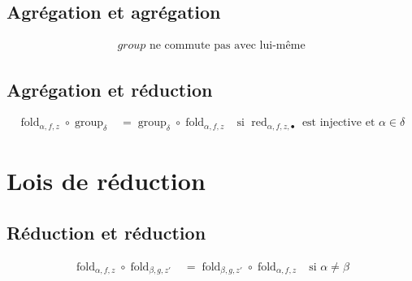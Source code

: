 \documentclass[french]{article}
\DeclareMathOperator{\group}{group}
\DeclareMathOperator{\redu}{red}
\newcommand{\groupDelta}{\group_{\delta}}
\newcommand{\fold}[3]{\operatorname{fold}_{#1, #2, #3}}
\newcommand{\foldAlphafz}{\fold{\alpha}{f}{z}}
\begin{document}
\subsection*{Agrégation et agrégation}
\begin{align}
\text{$group$ ne commute pas avec lui-même}
\end{align}

\subsection*{Agrégation et réduction}
\begin{align}
\foldAlphafz \circ \groupDelta
& = \groupDelta \circ \foldAlphafz
& \text{si $\redu_{\alpha, f, z, \bullet}$ est injective et $\alpha \in \delta$}
\end{align}

\section*{Lois de réduction}
\subsection*{Réduction et réduction}
\begin{align}
\foldAlphafz \circ \fold{\beta}{g}{z'}
& = \fold{\beta}{g}{z'} \circ \foldAlphafz
& \text{si $\alpha \neq \beta$}
\end{align}
\end{document}
